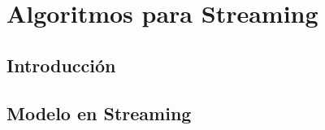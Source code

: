 \documentclass[../../document.tex]{subfiles}
\begin{document}
  \chapter{Algoritmos para Streaming}

    \section{Introducción}
      \paragraph{}

    \section{Modelo en Streaming}
      \paragraph{}
\end{document}
